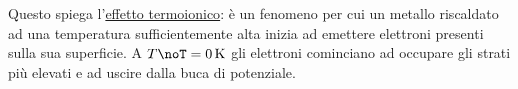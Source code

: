Questo spiega l'\underline{effetto termoionico}: è un fenomeno per cui un metallo riscaldato ad una temperatura sufficientemente alta inizia ad emettere elettroni presenti sulla sua superficie. A $T \noT=\SI{0}{K} $ gli elettroni cominciano ad occupare gli strati più elevati e ad uscire dalla buca di potenziale.

\fi














